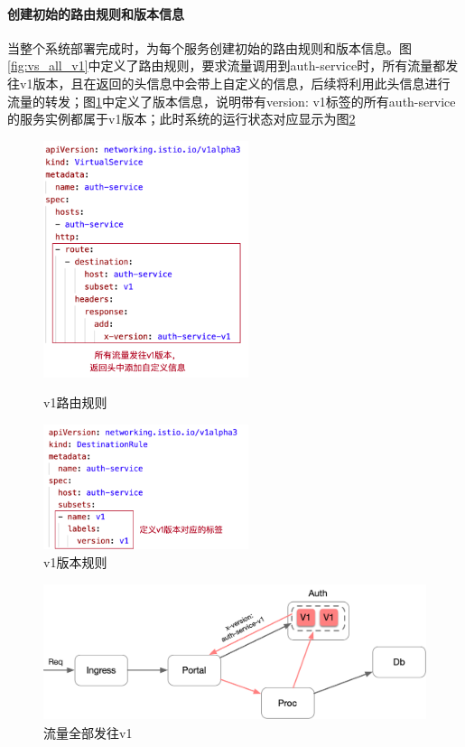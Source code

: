 \documentclass[a4paper, 12pt]{article}
\theoremstyle{definition}
\begin{document}
\paragraph{创建初始的路由规则和版本信息}\label{section:setup}当整个系统部署完成时，为每个服务创建初始的路由规则和版本信息。图\ref{fig:vs_all_v1}中定义了路由规则，要求流量调用到auth-service时，所有流量都发往v1版本，且在返回的头信息中会带上自定义的信息，后续将利用此头信息进行流量的转发；图\ref{fig:dr_v1}中定义了版本信息，说明带有{version: v1}标签的所有auth-service的服务实例都属于v1版本；此时系统的运行状态对应显示为图\ref{fig:traffic_all_v1}
\begin{figure}[htbp]
\centering
\begin{minipage}[t]{0.48\textwidth}
\centering
\centerline{\includegraphics[width=6cm]{vs_all_v1.png}}
\caption{v1路由规则}
\label{fig:vs_all_v1}
\end{minipage}
\begin{minipage}[t]{0.48\textwidth}
\centering
\centerline{\includegraphics[width=6cm]{dr_v1.png}}
\caption{v1版本规则}
\label{fig:dr_v1}
\end{minipage}
\end{figure}

\begin{figure}[ht]
 \centering
 \includegraphics[height=4cm]{images/traffic_all_v1.png}
 \caption{流量全部发往v1}
 \label{fig:traffic_all_v1}
\end{figure}
\end{document}

